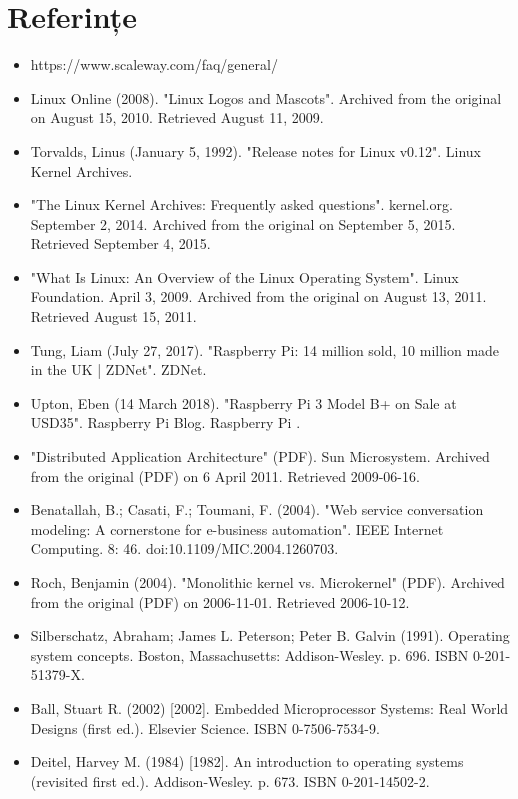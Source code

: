 \documentclass[a4paper, 12pt, twoside]{report}
\begin{document}
{\listoffigures

\lstlistoflistings

\chapter{Referințe}
\begin{itemize}
\item https://www.scaleway.com/faq/general/
\item Linux Online (2008). "Linux Logos and Mascots". Archived from the original on August 15, 2010. Retrieved August 11, 2009.
\item Torvalds, Linus (January 5, 1992). "Release notes for Linux v0.12". Linux Kernel Archives.
\item "The Linux Kernel Archives: Frequently asked questions". kernel.org. September 2, 2014. Archived from the original on September 5, 2015. Retrieved September 4, 2015.
\item "What Is Linux: An Overview of the Linux Operating System". Linux Foundation. April 3, 2009. Archived from the original on August 13, 2011. Retrieved August 15, 2011.
\item Tung, Liam (July 27, 2017). "Raspberry Pi: 14 million sold, 10 million made in the UK | ZDNet". ZDNet.
\item Upton, Eben (14 March 2018). "Raspberry Pi 3 Model B+ on Sale at USD35". Raspberry Pi Blog. Raspberry Pi .
\item  "Distributed Application Architecture" (PDF). Sun Microsystem. Archived from the original (PDF) on 6 April 2011. Retrieved 2009-06-16.
\item Benatallah, B.; Casati, F.; Toumani, F. (2004). "Web service conversation modeling: A cornerstone for e-business automation". IEEE Internet Computing. 8: 46. doi:10.1109/MIC.2004.1260703.
\item Roch, Benjamin (2004). "Monolithic kernel vs. Microkernel" (PDF). Archived from the original (PDF) on 2006-11-01. Retrieved 2006-10-12.
\item Silberschatz, Abraham; James L. Peterson; Peter B. Galvin (1991). Operating system concepts. Boston, Massachusetts: Addison-Wesley. p. 696. ISBN 0-201-51379-X.
\item Ball, Stuart R. (2002) [2002]. Embedded Microprocessor Systems: Real World Designs (first ed.). Elsevier Science. ISBN 0-7506-7534-9.
\item Deitel, Harvey M. (1984) [1982]. An introduction to operating systems (revisited first ed.). Addison-Wesley. p. 673. ISBN 0-201-14502-2.

\end{itemize}}
\end{document}
